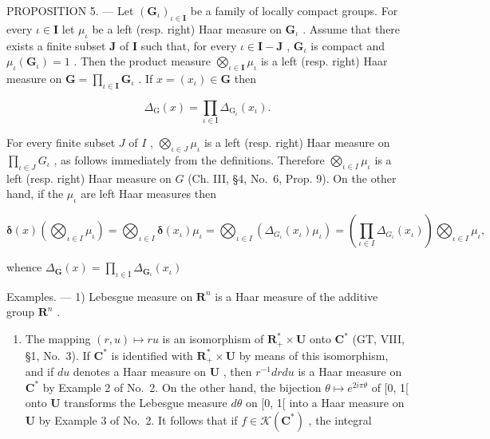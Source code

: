 PROPOSITION 5. --- Let \((\mathbf{G}_{\iota})_{\iota \in \mathbf{I}}\) be a family of locally compact groups. For every \(\iota \in \mathbf{I}\) let \(\mu_{\iota}\) be a left (resp. right) Haar measure on \(\mathbf{G}_{\iota}\) . Assume that there exists a finite subset \(\mathbf{J}\) of \(\mathbf{I}\) such that, for every \(\iota \in \mathbf{I} - \mathbf{J}\) , \(\mathbf{G}_{\iota}\) is compact and \(\mu_{\iota}(\mathbf{G}_{\iota}) = 1\) . Then the product measure \(\bigotimes_{\iota \in \mathbf{I}} \mu_{\iota}\) is a left (resp. right) Haar measure on \(\mathbf{G} = \prod_{\iota \in \mathbf{I}} \mathbf{G}_{\iota}\) . If \(x = (x_{\iota}) \in \mathbf{G}\) then

\[
\Delta_ {\mathrm{G}} (x) = \prod_ {\iota \in \mathrm{I}} \Delta_ {\mathrm{G} _ {\iota}} (x _ {\iota}).
\]

For every finite subset \(J\) of \(I\) , \(\bigotimes_{\iota \in J} \mu_{\iota}\) is a left (resp. right) Haar measure on \(\prod_{\iota \in J} G_{\iota}\) , as follows immediately from the definitions. Therefore \(\bigotimes_{\iota \in I} \mu_{\iota}\) is a left (resp. right) Haar measure on \(G\) (Ch. III, §4, No.~6, Prop. 9). On the other hand, if the \(\mu_{\iota}\) are left Haar measures then

\[
\boldsymbol {\delta} (x) \left(\bigotimes_ {\iota \in I} \mu_ {\iota}\right) = \bigotimes_ {\iota \in I} \boldsymbol {\delta} \left(x _ {\iota}\right) \mu_ {\iota} = \bigotimes_ {\iota \in I} \left(\Delta_ {G _ {\iota}} \left(x _ {\iota}\right) \mu_ {\iota}\right) = \left(\prod_ {\iota \in I} \Delta_ {G _ {\iota}} \left(x _ {\iota}\right)\right) \bigotimes_ {\iota \in I} \mu_ {\iota},
\]

whence \(\Delta_{\mathbf{G}}(x) = \prod_{\iota \in \mathrm{I}}\Delta_{\mathbf{G}_{\iota}}(x_{\iota})\)

Examples. --- 1) Lebesgue measure on \(\mathbf{R}^n\) is a Haar measure of the additive group \(\mathbf{R}^n\) .

\begin{enumerate}
\def\labelenumi{\arabic{enumi})}
\setcounter{enumi}{1}
\tightlist
\item
  The mapping \((r, u) \mapsto ru\) is an isomorphism of \(\mathbf{R}_+^* \times \mathbf{U}\) onto \(\mathbf{C}^*\) (GT, VIII, §1, No.~3). If \(\mathbf{C}^*\) is identified with \(\mathbf{R}_+^* \times \mathbf{U}\) by means of this isomorphism, and if \(du\) denotes a Haar measure on \(\mathbf{U}\) , then \(r^{-1} dr du\) is a Haar measure on \(\mathbf{C}^*\) by Example 2 of No.~2. On the other hand, the bijection \(\theta \mapsto e^{2i\pi\theta}\) of {[}0, 1{[} onto \(\mathbf{U}\) transforms the Lebesgue measure \(d\theta\) on {[}0, 1{[} into a Haar measure on \(\mathbf{U}\) by Example 3 of No.~2. It follows that if \(f \in \mathcal{K}(\mathbf{C}^*)\) , the integral
\end{enumerate}

